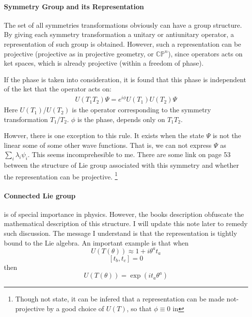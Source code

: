 \documentclass{article}
\numberwithin{equation}{subsection} %
\theoremstyle{definition}
\begin{document}
    \paragraph{Symmetry Group and its Representation} The set of all
    symmetries transformations obviously can have a group structure.
    By giving each symmetry transformation a unitary or antiunitary
    operator, a representation of such group is obtained. However,
    such a representation can be projective (projective as in
    projective geometry, or $\mathbb{CP}^n$), since operators acts
    on ket spaces, which is already projective (within a freedom of
    phase). 

    If the phase is taken into consideration, it is found that this
    phase is independent of the ket that the operator acts on:
    \begin{align}
        \label{eq:2.2_symmetries_projective_phase}
        U(T_1 T_2) \Psi = e^{i\phi} U(T_1) U(T_2) \Psi
    \end{align}
    Here $U(T_1)$/$U(T_2)$ is the operator corresponding to the symmetry
    transformation $T_1$/$T_2$. $\phi$ is the phase, depends only
    on $T_1 T_2$.

    Howver, there is one exception to this rule. It exists when the
    state $\Psi$ is not the linear some of some other wave functions.
    That is, we can not express $\Psi$ as $\sum_i \lambda_i \psi_i$.
    This seems incomprehesible to me.
    There are some link on page 53
    between the structure of Lie group associated
    with this symmetry and whether the representation can be projective.
    \footnote{Though not state, it can be infered that a representation
    can be made not-projective by a good choice of $U(T)$, so that
    $\phi \equiv 0$ in  }

    \paragraph{Connected Lie group} is of special importance in physics.
    However, the books description obfuscate the mathematical description
    of this structure. I will update this note later to remedy such
    discussion. The message I understand is that the representation is
    tightly bound to the Lie algebra. An important example is that when
    $$ U(T(\theta)) \approx 1 + i \theta^a t_a $$
    $$ [t_b,t_c] = 0$$
    then
    $$ U(T(\theta)) = \exp(it_a \theta^a) $$
\end{document}
